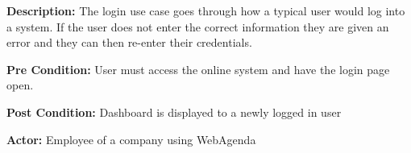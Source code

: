 \documentclass[letterpaper,12pt]{report}
\begin{document}
\begin{description}
 \item \textbf{Description:} \newline The login use case goes through how a typical user would log into a system. If the user does not enter the correct information they are given an error and they can then re-enter their credentials.
 \item \textbf{Pre Condition:} \newline User must access the online system and have the login page open.
 \item \textbf{Post Condition:} \newline Dashboard is displayed to a newly logged in user
 \item \textbf{Actor:} \newline Employee of a company using WebAgenda
\end{description}
\end{document}
